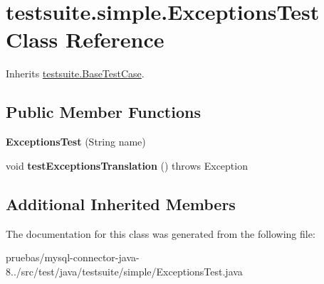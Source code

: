 \hypertarget{classtestsuite_1_1simple_1_1_exceptions_test}{}\section{testsuite.\+simple.\+Exceptions\+Test Class Reference}
\label{classtestsuite_1_1simple_1_1_exceptions_test}


Inherits \mbox{\hyperlink{classtestsuite_1_1_base_test_case}{testsuite.\+Base\+Test\+Case}}.

\subsection*{Public Member Functions}
\begin{DoxyCompactItemize}
\item 
\mbox{\label{classtestsuite_1_1simple_1_1_exceptions_test_a01ec3db7b2ee7155eb0fa1ef1bd1e072}} 
{\bfseries Exceptions\+Test} (String name)
\item 
\mbox{\label{classtestsuite_1_1simple_1_1_exceptions_test_a48e04060b958bc121cef6f69ae51f6a5}} 
void {\bfseries test\+Exceptions\+Translation} ()  throws Exception 
\end{DoxyCompactItemize}
\subsection*{Additional Inherited Members}


The documentation for this class was generated from the following file\+:\begin{DoxyCompactItemize}
\item 
pruebas/mysql-\/connector-\/java-\/8../src/test/java/testsuite/simple/Exceptions\+Test.\+java\end{DoxyCompactItemize}
